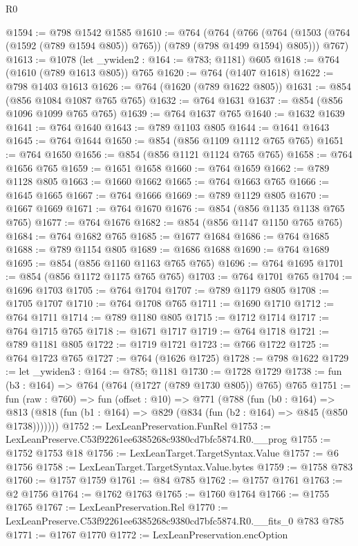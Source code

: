 \begin{lexlean}{R0}
\begin{coremodule}
@1594 := @798 @1542 @1585
@1610 := @764
    (@764
      (@766 (@764 (@1503 (@764 (@1592 (@789 @1594 @805)) @765)) (@789 (@798 @1499 @1594) @805)))
      @767)
@1613 := @1078 (let _ywiden2 : @164 := @783; @1181) @605
@1618 := @764 (@1610 (@789 @1613 @805)) @765
@1620 := @764 (@1407 @1618)
@1622 := @798 @1403 @1613
@1626 := @764 (@1620 (@789 @1622 @805))
@1631 := @854 (@856 @1084 @1087 @765 @765)
@1632 := @764 @1631
@1637 := @854 (@856 @1096 @1099 @765 @765)
@1639 := @764 @1637 @765
@1640 := @1632 @1639
@1641 := @764 @1640
@1643 := @789 @1103 @805
@1644 := @1641 @1643
@1645 := @764 @1644
@1650 := @854 (@856 @1109 @1112 @765 @765)
@1651 := @764 @1650
@1656 := @854 (@856 @1121 @1124 @765 @765)
@1658 := @764 @1656 @765
@1659 := @1651 @1658
@1660 := @764 @1659
@1662 := @789 @1128 @805
@1663 := @1660 @1662
@1665 := @764 @1663 @765
@1666 := @1645 @1665
@1667 := @764 @1666
@1669 := @789 @1129 @805
@1670 := @1667 @1669
@1671 := @764 @1670
@1676 := @854 (@856 @1135 @1138 @765 @765)
@1677 := @764 @1676
@1682 := @854 (@856 @1147 @1150 @765 @765)
@1684 := @764 @1682 @765
@1685 := @1677 @1684
@1686 := @764 @1685
@1688 := @789 @1154 @805
@1689 := @1686 @1688
@1690 := @764 @1689
@1695 := @854 (@856 @1160 @1163 @765 @765)
@1696 := @764 @1695
@1701 := @854 (@856 @1172 @1175 @765 @765)
@1703 := @764 @1701 @765
@1704 := @1696 @1703
@1705 := @764 @1704
@1707 := @789 @1179 @805
@1708 := @1705 @1707
@1710 := @764 @1708 @765
@1711 := @1690 @1710
@1712 := @764 @1711
@1714 := @789 @1180 @805
@1715 := @1712 @1714
@1717 := @764 @1715 @765
@1718 := @1671 @1717
@1719 := @764 @1718
@1721 := @789 @1181 @805
@1722 := @1719 @1721
@1723 := @766 @1722
@1725 := @764 @1723 @765
@1727 := @764 (@1626 @1725)
@1728 := @798 @1622
@1729 := let _ywiden3 : @164 := @785; @1181
@1730 := @1728 @1729
@1738 := fun (b3 : @164) => @764 (@764 (@1727 (@789 @1730 @805)) @765) @765
@1751 := fun (raw : @760) =>
  fun (offset : @10) =>
  @771
    (@788
      (fun (b0 : @164) =>
      @813 (@818 (fun (b1 : @164) => @829 (@834 (fun (b2 : @164) => @845 (@850 @1738)))))))
@1752 := LexLeanPreservation.FunRel
@1753 := LexLeanPreserve.C53f92261ee6385268c9380cd7bfc5874.R0.__prog
@1755 := @1752 @1753 @18
@1756 := LexLeanTarget.TargetSyntax.Value
@1757 := @6 @1756
@1758 := LexLeanTarget.TargetSyntax.Value.bytes
@1759 := @1758 @783
@1760 := @1757 @1759
@1761 := @84 @785
@1762 := @1757 @1761
@1763 := @2 @1756
@1764 := @1762 @1763
@1765 := @1760 @1764
@1766 := @1755 @1765
@1767 := LexLeanPreservation.Rel
@1770 := LexLeanPreserve.C53f92261ee6385268c9380cd7bfc5874.R0.__fits_0 @783 @785
@1771 := @1767 @1770
@1772 := LexLeanPreservation.encOption

\end{coremodule}
\end{lexlean}
